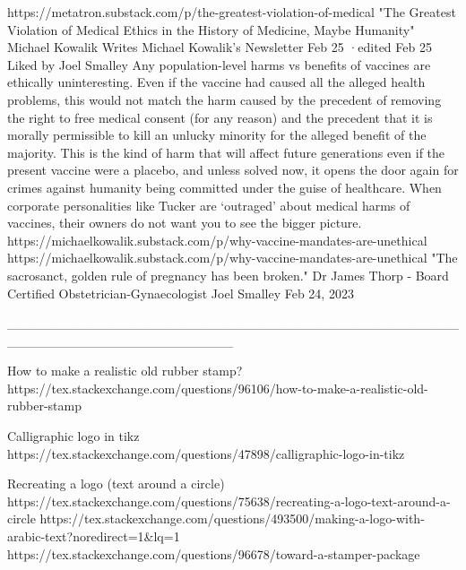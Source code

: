 https://metatron.substack.com/p/the-greatest-violation-of-medical
"The Greatest Violation of Medical Ethics in the History of Medicine, Maybe Humanity"
Michael Kowalik
Writes Michael Kowalik’s Newsletter
Feb 25
·edited Feb 25
Liked by Joel Smalley
Any population-level harms vs benefits of vaccines are ethically uninteresting. Even if the vaccine had caused all the alleged health problems, this would not match the harm caused by the precedent of removing the right to free medical consent (for any reason) and the precedent that it is morally permissible to kill an unlucky minority for the alleged benefit of the majority. This is the kind of harm that will affect future generations even if the present vaccine were a placebo, and unless solved now, it opens the door again for crimes against humanity being committed under the guise of healthcare. When corporate personalities like Tucker are ‘outraged’ about medical harms of vaccines, their owners do not want you to see the bigger picture. https://michaelkowalik.substack.com/p/why-vaccine-mandates-are-unethical
https://michaelkowalik.substack.com/p/why-vaccine-mandates-are-unethical
"The sacrosanct, golden rule of pregnancy has been broken." Dr James Thorp - Board Certified Obstetrician-Gynaecologist
Joel Smalley
Feb 24, 2023












________________________________________________________________________


How to make a realistic old rubber stamp?
https://tex.stackexchange.com/questions/96106/how-to-make-a-realistic-old-rubber-stamp


Calligraphic logo in tikz
https://tex.stackexchange.com/questions/47898/calligraphic-logo-in-tikz

Recreating a logo (text around a circle)
https://tex.stackexchange.com/questions/75638/recreating-a-logo-text-around-a-circle
https://tex.stackexchange.com/questions/493500/making-a-logo-with-arabic-text?noredirect=1&lq=1
https://tex.stackexchange.com/questions/96678/toward-a-stamper-package






















